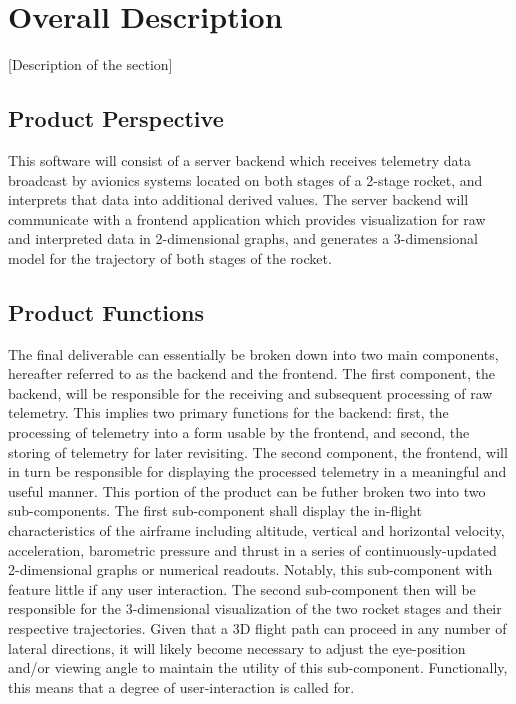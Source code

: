 \documentclass[onecolumn, draftclsnofoot,10pt, compsoc]{IEEEtran}
\begin{document}
	\newpage
	\section{Overall Description}
		[Description of the section]

		\subsection{Product Perspective}
			This software will consist of a server backend which receives telemetry data broadcast by avionics systems located on both stages of a 2-stage rocket, and interprets that data into additional derived values. 
			The server backend will communicate with a frontend application which provides visualization for raw and interpreted data in 2-dimensional graphs, and generates a 3-dimensional model for the trajectory of both stages of the rocket.

		\subsection{Product Functions}
			The final deliverable can essentially be broken down into two main components, hereafter referred to as the backend and the frontend.
			The first component, the backend, will be responsible for the receiving and subsequent processing of raw telemetry.
			This implies two primary functions for the backend: first, the processing of telemetry into a form usable by the frontend, and second, the storing of telemetry for later revisiting.
			The second component, the frontend, will in turn be responsible for displaying the processed telemetry in a meaningful and useful manner.
			This portion of the product can be futher broken two into two sub-components.
			The first sub-component shall display the in-flight characteristics of the airframe including altitude, vertical and horizontal velocity, acceleration, barometric pressure and thrust in a series of continuously-updated 2-dimensional graphs or numerical readouts. 
			Notably, this sub-component with feature little if any user interaction. 
			The second sub-component then will be responsible for the 3-dimensional visualization of the two rocket stages and their respective trajectories. 
			Given that a 3D flight path can proceed in any number of lateral directions, it will likely become necessary to adjust the eye-position and/or viewing angle to maintain the utility of this sub-component.
			Functionally, this means that a degree of user-interaction is called for.
			
\end{document}
